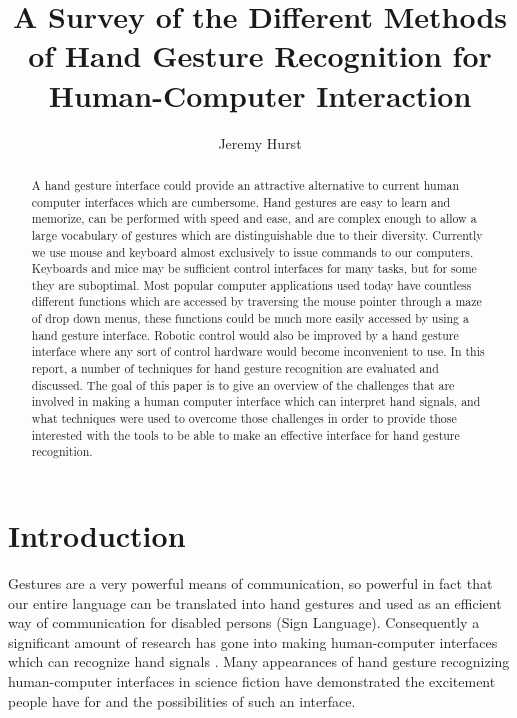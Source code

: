 \documentclass[a4paper,12pt]{report}
\title{A Survey of the Different Methods of Hand Gesture Recognition for Human-Computer Interaction}
\author{Jeremy Hurst}
\begin{document}
\maketitle

\begin{abstract}

A hand gesture interface could provide an attractive alternative to current human computer interfaces which are cumbersome. Hand gestures are easy to learn and memorize, can be performed with speed and ease, and are complex enough to  allow a large vocabulary of gestures which are distinguishable due to their diversity.  Currently we use mouse and keyboard almost exclusively to issue commands to our computers. Keyboards and mice may be sufficient control interfaces for many tasks, but for some they are suboptimal. Most popular computer applications used today have countless different functions which are accessed by traversing the mouse pointer through a maze of drop down menus, these functions could be much more easily accessed by using a hand gesture interface. Robotic control would also be improved by a hand gesture interface where any sort of control hardware would become inconvenient to use.   In this report, a number of techniques for hand gesture recognition are evaluated and discussed. The goal of this paper is to give an overview of the challenges that are involved in making a human computer interface which can interpret hand signals, and what techniques were used to overcome those challenges in order to provide those interested with the tools to be able to make an effective interface for hand gesture recognition. 

\end{abstract}
\tableofcontents
\maketitle
\section{Introduction}

Gestures are a very powerful means of communication, so powerful in fact that our entire language can be translated into hand gestures and used as an efficient way of communication for disabled persons (Sign Language). Consequently a significant amount of research has gone into making human-computer interfaces which can recognize hand signals \cite{1} \cite{2}. Many appearances of hand gesture recognizing human-computer interfaces in science fiction have demonstrated the excitement people have for and the possibilities of such an interface. 
\end{document}
